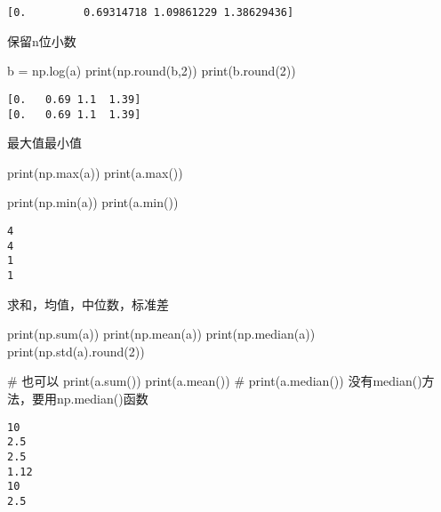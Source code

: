 \documentclass[
  letterpaper,
  DIV=11,
  numbers=noendperiod]{scrreprt}
\newenvironment{Shaded}{\begin{snugshade}}{\end{snugshade}}
\newcommand{\BuiltInTok}[1]{\textcolor[rgb]{0.00,0.23,0.31}{#1}}
\newcommand{\CommentTok}[1]{\textcolor[rgb]{0.37,0.37,0.37}{#1}}
\newcommand{\DecValTok}[1]{\textcolor[rgb]{0.68,0.00,0.00}{#1}}
\newcommand{\NormalTok}[1]{\textcolor[rgb]{0.00,0.23,0.31}{#1}}
\newcommand{\OperatorTok}[1]{\textcolor[rgb]{0.37,0.37,0.37}{#1}}
\begin{document}
\begin{verbatim}
[0.         0.69314718 1.09861229 1.38629436]
\end{verbatim}

保留n位小数

\begin{Shaded}
\begin{Highlighting}[]
\NormalTok{b }\OperatorTok{=}\NormalTok{ np.log(a)}
\BuiltInTok{print}\NormalTok{(np.}\BuiltInTok{round}\NormalTok{(b,}\DecValTok{2}\NormalTok{))}
\BuiltInTok{print}\NormalTok{(b.}\BuiltInTok{round}\NormalTok{(}\DecValTok{2}\NormalTok{))}
\end{Highlighting}
\end{Shaded}

\begin{verbatim}
[0.   0.69 1.1  1.39]
[0.   0.69 1.1  1.39]
\end{verbatim}

最大值最小值

\begin{Shaded}
\begin{Highlighting}[]
\BuiltInTok{print}\NormalTok{(np.}\BuiltInTok{max}\NormalTok{(a))}
\BuiltInTok{print}\NormalTok{(a.}\BuiltInTok{max}\NormalTok{())}

\BuiltInTok{print}\NormalTok{(np.}\BuiltInTok{min}\NormalTok{(a))}
\BuiltInTok{print}\NormalTok{(a.}\BuiltInTok{min}\NormalTok{())}
\end{Highlighting}
\end{Shaded}

\begin{verbatim}
4
4
1
1
\end{verbatim}

求和，均值，中位数，标准差

\begin{Shaded}
\begin{Highlighting}[]
\BuiltInTok{print}\NormalTok{(np.}\BuiltInTok{sum}\NormalTok{(a))}
\BuiltInTok{print}\NormalTok{(np.mean(a))}
\BuiltInTok{print}\NormalTok{(np.median(a))}
\BuiltInTok{print}\NormalTok{(np.std(a).}\BuiltInTok{round}\NormalTok{(}\DecValTok{2}\NormalTok{))}

\CommentTok{\# 也可以}
\BuiltInTok{print}\NormalTok{(a.}\BuiltInTok{sum}\NormalTok{())}
\BuiltInTok{print}\NormalTok{(a.mean())}
\CommentTok{\# print(a.median()) 没有median()方法，要用np.median()函数}
\end{Highlighting}
\end{Shaded}

\begin{verbatim}
10
2.5
2.5
1.12
10
2.5
\end{verbatim}
\end{document}
